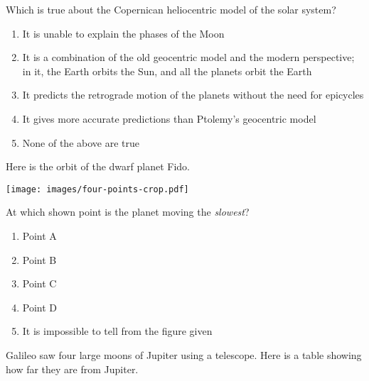 \documentclass[12pt]{article}
\def\BS{\bigskip}
\newcommand{\BC}{\begin{center}}
\newcommand{\EC}{\end{center}}
\begin{document}
\begin{enumerate}
\vspace{0.5in}

\begin{minipage}{\textwidth}
\item{Which is true about the Copernican heliocentric model of the solar system?

\begin{enumerate}[label=(\Alph*)]
\setlength\itemsep{0.0em}
\item{ It is unable to explain the phases of the Moon }
\item{ It is a combination of the old geocentric model and the modern perspective; in it, the Earth orbits the Sun, and all the  planets orbit the Earth }
\item{ It predicts the retrograde motion of the planets without the need for epicycles }
\item{ It gives more accurate predictions than Ptolemy's geocentric model }
\item{ None of the above are true }
\end{enumerate}
} %
\end{minipage}


\vspace{0.5in}

\begin{minipage}{\textwidth}
\item{Here is the orbit of the dwarf planet Fido.

\BS
\BC
\texttt{[image: images/four-points-crop.pdf]}
\EC
\BS

At which shown point is the planet moving the {\it slowest}?

\begin{enumerate}[label=(\Alph*)]
\setlength\itemsep{0.0em}
\item{ Point A }
\item{ Point B }
\item{ Point C }
\item{ Point D }
\item{ It is impossible to tell from the figure given }
\end{enumerate}
} %
\end{minipage}


\vspace{0.5in}

\begin{minipage}{\textwidth}
\item{Galileo saw four large moons of Jupiter using a telescope. Here is a table showing how far they are from Jupiter.
\bigskip

}
\end{minipage}
\end{enumerate}
\end{document}
